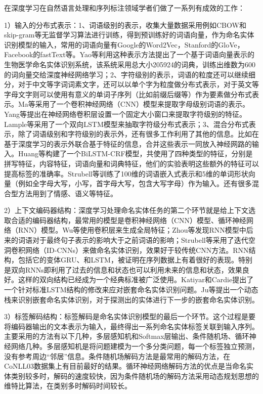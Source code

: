 \documentclass[winfonts,master,oneside,nobackinfo]{njuthesis}
\begin{document}
在深度学习在自然语言处理和序列标注领域学者们做了一系列有成效的工作：

1）输入的分布式表示：1、词语级别的表示\cite{Nguyen}，收集大量数据采用例如CBOW和skip-gram等无监督学习算法进行训练，得到预训练好的词语向量，作为命名实体识别模型的输入，常用的词语向量有Google的Word2Vec，Stanford的GloVe，Facebook的fastText等。Yao等\cite{Yao}利用这种表示方法提出了一个基于词语向量表示的生物医学命名实体识别系统，该系统采用总大小205924的词典，训练出维数为600的词向量交给深度神经网络学习；2、字符级别的表示，词语的粒度还可以继续细分\cite{Kuru}，对于中文等字词词素文字，还可以以单个字为粒度做分布式表示，对于英文等字母文字则可以使用有意义的单词子序列（比如前缀后缀等）作为要素做分布式表示。Ma等\cite{Ma}采用了一个卷积神经网络（CNN）模型来提取字母级别词语的表示。Yang等\cite{Yang}提出在神经网络卷积层设置一个固定大小窗口来提取字符级别的特征。Lample等\cite{Lample}采用了一个双向LSTM模型来抽取字符级分布式表示；3、混合分布式表示，除了词语级别和字符级别的表示外，还有很多工作利用了其他的信息。比如在基于深度学习的表示外联合基于特征的信息，合并这些表示一同放入神经网路的输入。Huang等\cite{Huang}构建了一个BiLSTM-CRF模型，共使用了四种类型的特征，分别是拼写特征，内容特征，词语向量和词典特征，他们的实验表明这些额外的特征可以提高标签的准确率。Strubell等\cite{Strubell}训练了100维的词语嵌入式表示和5维的单词形状向量（例如全字母大写，小写，首字母大写，包含大写字母）作为输入。还有很多混合型方法用到了情感、语义\cite{Jansson}等特征。

2）上下文编码器结构：深度学习处理命名实体任务的第二个环节就是给上下文选取合适的编码器结构，最常用的模型是卷积神经网络（CNN）模型、循环神经网络（RNN）模型。Wu等\cite{Wu}使用卷积层来生成全局特征；Zhou等\cite{zhou}发现RNN模型中后来的词语对于最终句子表示的影响大于之前词语的影响；Strubell\cite{Strubell}等采用了迭代空洞卷积网络（ID-CNNs）来做命名实体识别，效果好于较传统CNN方法。RNN结构，包括它的变体GRU、和LSTM，被证明在序列数据上有着很好的表现。特别是双向RNNs\cite{Huang}即利用了过去的信息和状态也可以利用未来的信息和状态，效果良好。这样的双向结构已经成为一个经典标准被广泛使用。Katiyar和Cardie\cite{Katiyar}提出了一个针对标准LSTM结构的修改来应对嵌套命名实体识别问题。Ju等\cite{Ju}提出一个动态栈来识别嵌套命名实体识别，对于探测出的实体进行下一步的嵌套命名实体识别。

3）标签解码结构：标签解码是命名实体识别模型的最后一个环节。这个过程是要将编码器输出的文本表示为输入，最终得出一系列命名实体标签关联到输入序列。主要采用的方法有以下几种，多层感知机和Softmax层输出\cite{Strubell}、条件随机场\cite{Huang}、循环神经网络\cite{Shen}几种。多层感知机是将问题建模为一个多分类问题，每一个标签独立预测，没有参考周边“邻居”信息。条件随机场解码方法是最常用的解码方法，在CoNLL03数据集上有目前最好的结果\cite{Akbik}。循环神经网络解码方法的优点是\cite{Shen}当命名实体类别较多时，解码的速度较快，因为条件随机场的解码方法采用动态规划思想的维特比算法，在类别多时解码时间较长。
\end{document}
